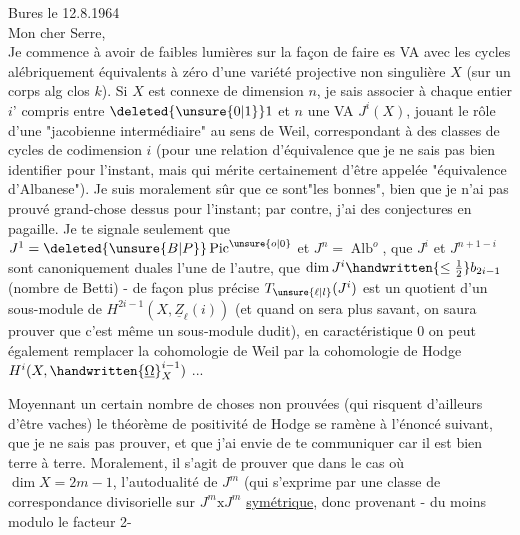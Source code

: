 \hfill Bures le 12.8.1964\\
Mon cher Serre,\\

Je commence à avoir de faibles lumières sur la façon de faire es VA avec les cycles alébriquement équivalents à zéro d'une variété projective non singulière $X$ (sur un corps alg clos $k$). Si $X$ est connexe de dimension $n$, je sais associer à chaque entier $i$' compris entre $\deleted{\unsure{0|1}}1$ et $n$ une VA $J^i(X)$, jouant le rôle d'une "jacobienne intermédiaire" au sens de Weil, correspondant à des classes de cycles de codimension $i$ (pour une relation d'équivalence que je ne sais pas bien identifier pour l'instant, mais qui mérite certainement d'être appelée "équivalence d'Albanese"). Je suis moralement sûr que ce sont"les bonnes", bien que je n'ai pas prouvé grand-chose dessus pour l'instant; par contre, j'ai des conjectures en pagaille. Je te signale seulement que $J^1=\deleted{\unsure{B|P}}\operatorname{Pic}^{\unsure{o|0}}$ et $J^n=\operatorname{Alb}^{o}$, que $J^i$ et $J^{n+1-i}$ sont canoniquement duales l'une de l'autre, que $\dim J^i\handwritten{\leq\frac{1}{2}}b_{2i-1}$ (nombre de Betti) - de façon plus précise $T_{\unsure{\ell|l}}(J^i)$ est un quotient d'un sous-module de $H^{2i-1}(X,\underline{Z}_{\ell}(i))$ (et quand on sera plus savant, on saura prouver que c'est même un sous-module dudit), en caractéristique $0$ on peut également remplacer la cohomologie de Weil par la cohomologie de Hodge $H^i(X,\handwritten{\underline{\Omega}}_X^{i-1})$ ...


Moyennant un certain nombre de choses non prouvées (qui risquent d'ailleurs d'être vaches) le théorème de positivité de Hodge se ramène à l'énoncé suivant, que je ne sais pas prouver, et que j'ai envie de te communiquer car il est bien terre à terre. Moralement, il s'agit de prouver que dans le cas où $\dim X=2m-1$, l'autodualité de $J^m$
(qui s'exprime par une classe de correspondance divisorielle sur $J^m\mathbin{\mathrm{x}}J^m$ \uline{symétrique}, donc provenant - du moins modulo le facteur 2-
